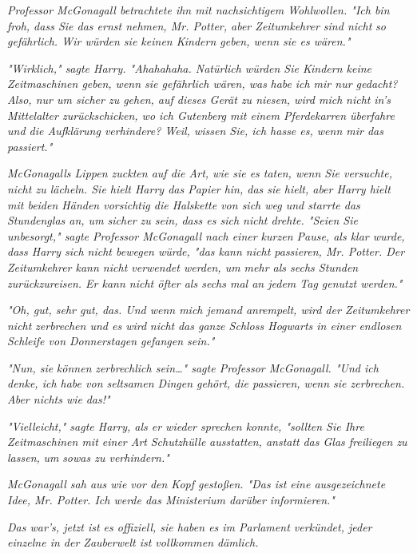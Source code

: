 {\emph{Professor McGonagall betrachtete ihn mit nachsichtigem Wohlwollen. "Ich bin froh, dass Sie das ernst nehmen, Mr. Potter, aber Zeitumkehrer sind nicht} \emph{\emph{so}} \emph{gefährlich. Wir würden sie keinen Kindern geben, wenn sie es wären."}

\emph{"Wirklich," sagte Harry. "Ahahahaha. Natürlich würden Sie Kindern keine Zeitmaschinen geben, wenn sie gefährlich wären, was} \emph{\emph{habe}} \emph{ich mir nur gedacht? Also, nur um sicher zu gehen, auf dieses Gerät zu niesen, wird mich} \emph{\emph{nicht}} \emph{in's Mittelalter zurückschicken, wo ich Gutenberg mit einem Pferdekarren überfahre und die Aufklärung verhindere? Weil, wissen Sie, ich hasse es, wenn mir das passiert."}

\emph{McGonagalls Lippen zuckten auf die Art, wie sie es taten, wenn Sie versuchte, nicht zu lächeln. Sie hielt Harry das Papier hin, das sie hielt, aber Harry hielt mit beiden Händen vorsichtig die Halskette von sich weg und starrte das Stundenglas an, um sicher zu sein, dass es sich nicht drehte. "Seien Sie unbesorgt," sagte Professor McGonagall nach einer kurzen Pause, als klar wurde, dass Harry sich nicht bewegen würde, "das kann nicht passieren, Mr. Potter. Der Zeitumkehrer kann nicht verwendet werden, um mehr als sechs Stunden zurückzureisen. Er kann nicht öfter als sechs mal an jedem Tag genutzt werden."}

\emph{"Oh, gut, sehr gut, das. Und wenn mich jemand anrempelt, wird der Zeitumkehrer} \emph{\emph{nicht}} \emph{zerbrechen und es wird} \emph{\emph{nicht}} \emph{das ganze Schloss Hogwarts in einer endlosen Schleife von Donnerstagen gefangen sein."}

\emph{"Nun, sie} \emph{\emph{können}} \emph{zerbrechlich sein…" sagte Professor McGonagall. "Und ich denke, ich habe von seltsamen Dingen gehört, die passieren, wenn sie zerbrechen. Aber nichts wie} \emph{\emph{das!}"}

\emph{"Vielleicht," sagte Harry, als er wieder sprechen konnte, "sollten Sie Ihre Zeitmaschinen mit einer Art} \emph{\emph{Schutzhülle}} \emph{ausstatten, anstatt} \emph{\emph{das Glas freiliegen zu lassen,}} \emph{um} \emph{\emph{sowas zu verhindern.}"}

\emph{McGonagall sah aus wie vor den Kopf gestoßen. "Das ist eine ausgezeichnete Idee, Mr. Potter. Ich werde das Ministerium darüber informieren."}

\emph{\emph{Das war's, jetzt ist es offiziell, sie haben es im Parlament verkündet, jeder einzelne in der Zauberwelt ist vollkommen dämlich.}}

}
